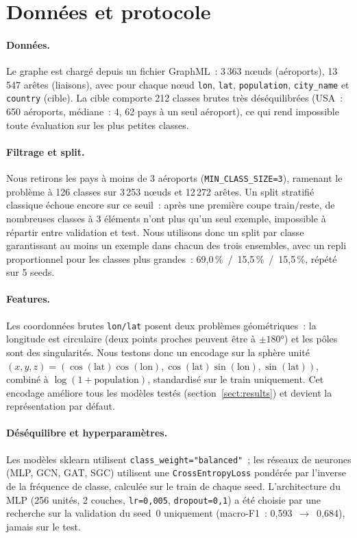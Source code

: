 \documentclass[french]{llncs}
\begin{document}
    \section{Données et protocole} \label{sect:protocol}

    \paragraph{Données.} Le graphe est chargé depuis un fichier GraphML~: 3\,363 nœuds (aéroports), 13\,547 arêtes (liaisons), 
    avec pour chaque nœud \texttt{lon}, \texttt{lat}, \texttt{population}, \texttt{city\_name} et \texttt{country} (cible). 
    La cible comporte 212 classes brutes très déséquilibrées (USA~: 650 aéroports, médiane~: 4, 62 pays à un seul aéroport), 
    ce qui rend impossible toute évaluation sur les plus petites classes.

    \paragraph{Filtrage et split.} Nous retirons les pays à moins de 3 aéroports (\texttt{MIN\_CLASS\_SIZE=3}), ramenant 
    le problème à 126 classes sur 3\,253 nœuds et 12\,272 arêtes. Un split stratifié classique échoue encore sur ce seuil~: 
    après une première coupe train/reste, de nombreuses classes à 3 éléments n'ont plus qu'un seul exemple, 
    impossible à répartir entre validation et test. Nous utilisons donc un split par classe garantissant au moins 
    un exemple dans chacun des trois ensembles, avec un repli 
    proportionnel pour les classes plus grandes~: 69,0\,\%~/~15,5\,\%~/~15,5\,\%, répété sur 5 seeds.

    \paragraph{Features.} Les coordonnées brutes \texttt{lon/lat} posent deux problèmes géométriques~: 
    la longitude est circulaire (deux points proches peuvent être à $\pm180°$) et les pôles sont des singularités. 
    Nous testons donc un encodage sur la sphère unité 
    $(x,y,z) = (\cos(\text{lat})\cos(\text{lon}), \cos(\text{lat})\sin(\text{lon}), \sin(\text{lat}))$, combiné à $\log(1+\text{population})$, 
    standardisé sur le train uniquement. Cet encodage améliore tous les modèles testés (section~\ref{sect:results}) et devient 
    la représentation par défaut.

    \paragraph{Déséquilibre et hyperparamètres.} Les modèles sklearn utilisent \texttt{class\_weight="balanced"}~; 
    les réseaux de neurones (MLP, GCN, GAT, SGC) utilisent une \texttt{CrossEntropyLoss} pondérée par l'inverse de la fréquence 
    de classe, calculée sur le train de chaque seed. 
    L'architecture du MLP (256 unités, 2 couches, \texttt{lr=0,005}, \texttt{dropout=0,1}) a été choisie par une recherche sur 
    la validation du seed~0 uniquement (macro-F1~: 0,593~$\rightarrow$~0,684), jamais sur le test.

    \newpage
    
    
\end{document}
